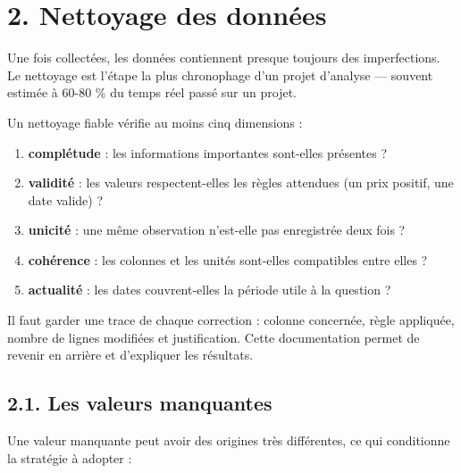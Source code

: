 \documentclass[
  french,
  letterpaper,
  open=any]{scrbook}
\providecommand{\tightlist}{%
  \setlength{\itemsep}{0pt}\setlength{\parskip}{0pt}}
\theoremstyle{definition}
\theoremstyle{definition}
\theoremstyle{remark}
\begin{document}
\section{2. Nettoyage des données}\label{nettoyage-des-donnuxe9es}

Une fois collectées, les données contiennent presque toujours des
imperfections. Le nettoyage est l'étape la plus chronophage d'un projet
d'analyse --- souvent estimée à 60-80 \% du temps réel passé sur un
projet.

Un nettoyage fiable vérifie au moins cinq dimensions :

\begin{enumerate}
\def\labelenumi{\arabic{enumi}.}
\tightlist
\item
  \textbf{complétude} : les informations importantes sont-elles
  présentes ?
\item
  \textbf{validité} : les valeurs respectent-elles les règles attendues
  (un prix positif, une date valide) ?
\item
  \textbf{unicité} : une même observation n'est-elle pas enregistrée
  deux fois ?
\item
  \textbf{cohérence} : les colonnes et les unités sont-elles compatibles
  entre elles ?
\item
  \textbf{actualité} : les dates couvrent-elles la période utile à la
  question ?
\end{enumerate}

Il faut garder une trace de chaque correction : colonne concernée, règle
appliquée, nombre de lignes modifiées et justification. Cette
documentation permet de revenir en arrière et d'expliquer les résultats.

\subsection{2.1. Les valeurs manquantes}\label{les-valeurs-manquantes}

Une valeur manquante peut avoir des origines très différentes, ce qui
conditionne la stratégie à adopter :
\end{document}
